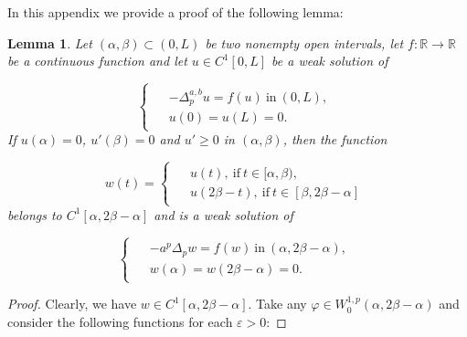 \documentclass[a4paper,11pt]{article}
\newcommand{\R}{\mathbb{R}}
\newtheorem{lema}{Lemma}[section]
\begin{document}
{In this appendix we provide a proof of the following lemma:

\begin{lema} \label{L1} Let $(\alpha,\beta) \subset (0, L)$ be two nonempty open intervals, let $f : \R \rightarrow \R$ be a continuous function and let $u \in C^{1}[0,L]$ be a weak solution of

\begin{equation*}
\begin{cases}
\begin{aligned}
& - \Delta_{p}^{a,b} u = f(u) \ \text{in} \ (0,L), \\
& u(0) = u(L) = 0.
\end{aligned}
\end{cases}
\end{equation*}
If $u(\alpha) = 0$, $u'(\beta) = 0$ and $u' \geq 0$ in $(\alpha,\beta)$, then the function

\begin{equation*}
w(t) =
\begin{cases}
\begin{aligned}
     & u(t), \ \text{if} \ t \in [\alpha,\beta), \\
     & u(2\beta - t), \ \text{if} \ t \in [\beta,2\beta - \alpha]
\end{aligned}
\end{cases}
\end{equation*}
belongs to $C^1[\alpha, 2 \beta - \alpha]$ and is a weak solution of

\begin{equation*}
\begin{cases}
\begin{aligned}
& -a^{p}\Delta_{p} w = f(w) \ \text{in} \ (\alpha, 2\beta - \alpha), \\
& w(\alpha) = w(2\beta - \alpha) = 0.
\end{aligned}
\end{cases}
\end{equation*}
\end{lema}

\begin{proof} Clearly, we have $w \in C^1[\alpha, 2 \beta - \alpha]$. Take any $\varphi \in W^{1,p}_{0}(\alpha, 2\beta - \alpha)$ and consider the following functions for each $\varepsilon > 0$:


\end{proof}}
\end{document}
